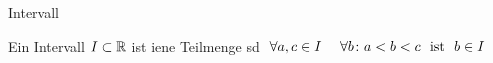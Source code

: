 \documentclass[class=article, crop=false]{standalone}
\begin{document}
\begin{zettel}{Intervall}
\begin{flashcard}
    \begin{definition}
        Ein Intervall $I \subset \mathbb{R} $ ist iene Teilmenge sd $\forall  a , c \in  I \quad \forall  b \colon a <  b <  c \tx{ ist } b \in  I$ 
    
    \end{definition}

\end{flashcard}
\end{zettel}
\end{document}
